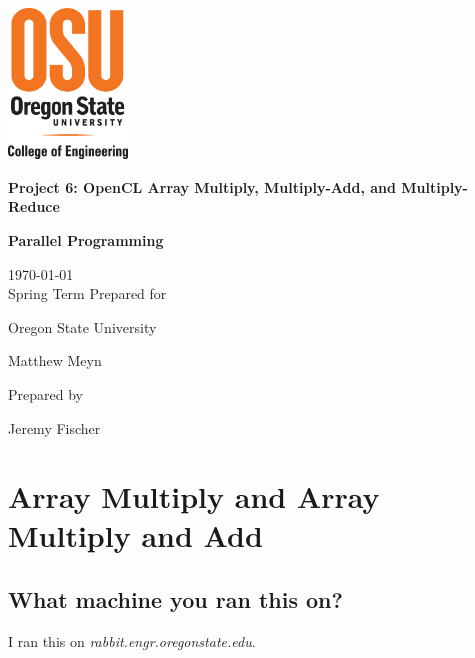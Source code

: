 \documentclass[onecolumn,draftclsnofoot, 10pt, compsoc]{IEEEtran}
\def \Jeremy{			Jeremy Fischer}
\def \Class{		Parallel Programming}
\def \Assn{		Project 6: OpenCL Array Multiply, Multiply-Add, and Multiply-Reduce}
\def \School{	Oregon State University}
\def \Professor{		Matthew Meyn}
\begin{document}
\begin{titlepage}
    \begin{singlespace}
    	\includegraphics[height=4cm]{coe.eps}
        \hfill  
        \par\vspace{.2in}
        \centering
        \scshape{
            \vspace{.5in}
            \textbf{\Large\Assn}\par
            \textbf{\large\Class}\par
            \large{
            	\today \\Spring Term
        	}
            \vfill
            {\large Prepared for}\par
            \huge \School\par
            \vspace{5pt}
            {\Large{\Professor}\par}
            {\large Prepared by }\par

            \vspace{5pt}
            {\Large
                {\Jeremy}\par
            }
            \vspace{20pt}
        }

    \end{singlespace}
\end{titlepage}
\newpage
{}

\clearpage




\section{Array Multiply and Array Multiply and Add}
	\subsection{What machine you ran this on?}
		I ran this on \textit{rabbit.engr.oregonstate.edu}.
	
\end{document}
